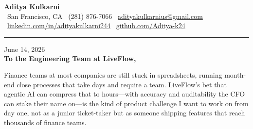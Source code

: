 \documentclass[11pt,letterpaper]{article}
\begin{document}
\begin{center}
    {\Huge \textbf{\color{LiveFlowGreen} Aditya Kulkarni}}\\[8pt]
    {\color{DarkGrey} \small
    \faMapMarker* \ San Francisco, CA \quad \textbar \quad
    \faPhone \ (281) 876-7066 \quad \textbar \quad
    \faEnvelope \ \href{mailto:adityakulkarnius@gmail.com}{adityakulkarnius@gmail.com} \\[4pt]
    \faLinkedin \ \href{https://linkedin.com/in/adityakulkarni244}{linkedin.com/in/adityakulkarni244} \quad \textbar \quad
    \faGithub \ \href{https://github.com/Aditya-k24}{github.com/Aditya-k24}
    }
\end{center}

\vspace{-4pt}
{\color{LiveFlowGreen}\rule{\linewidth}{1.5pt}}
\vspace{10pt}

June 14, 2026\\[10pt]
\textbf{To the Engineering Team at LiveFlow,}

\vspace{6pt}

Finance teams at most companies are still stuck in spreadsheets, running month-end close processes that take days and require a team. LiveFlow's bet that agentic AI can compress that to hours---with accuracy and auditability the CFO can stake their name on---is the kind of product challenge I want to work on from day one, not as a junior ticket-taker but as someone shipping features that reach thousands of finance teams.

\vspace{4pt}
\end{document}
